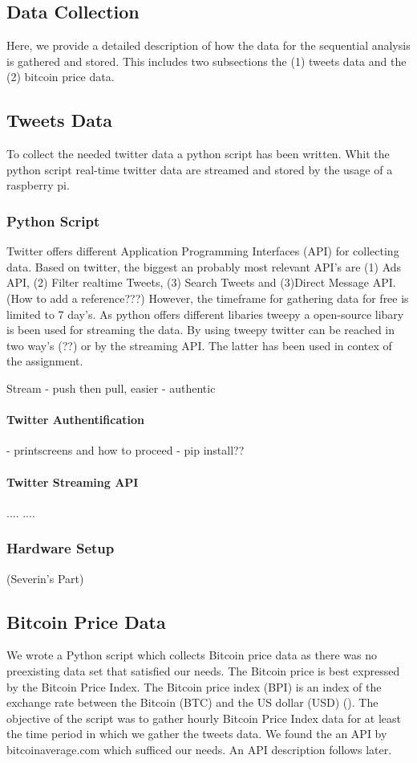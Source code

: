 \documentclass[a4paper,12pt]{article}
\begin{document}
\begin{spacing}{1.2}
\section{Data Collection}
Here, we provide a detailed description of how the data for the sequential analysis is gathered and stored. This includes two  subsections the (1) tweets data and the (2) bitcoin price data.
\subsection{Tweets Data}
To collect the needed twitter data a python script has been written. Whit the python script real-time twitter data are streamed and stored by the usage of a raspberry pi.
\subsubsection{Python Script}
Twitter offers different Application Programming Interfaces (API) for collecting data. Based on twitter, the biggest an probably most relevant API's are (1) Ads API, (2) Filter realtime Tweets, (3) Search Tweets and (3)Direct Message API. (How to add a reference???) However, the timeframe for gathering data for free is limited to 7 day's. As python offers different libaries tweepy a open-source libary is been used for streaming the data. By using tweepy twitter can be reached in two way's (??) or by the streaming API. The latter has been used in contex of the assignment.

Stream - push then pull, easier
- authentic
\paragraph{Twitter Authentification}
- printscreens and how to proceed
- pip install??

\paragraph{Twitter Streaming API}
....
....

\subsubsection{Hardware Setup}
(Severin's Part)

\subsection{Bitcoin Price Data}
We wrote a Python script which collects Bitcoin price data as there was no preexisting data set that satisfied our needs. The Bitcoin price is best expressed by the Bitcoin Price Index. The Bitcoin price index (BPI) is an index of the exchange rate between the Bitcoin (BTC) and the US dollar (USD) (\cite{kristoufek2015main}). The objective of the script was to gather hourly Bitcoin Price Index data for at least the time period in which we gather the tweets data. We found the an API by bitcoinaverage.com which sufficed our needs. An API description follows later.

\end{spacing}
\end{document}

